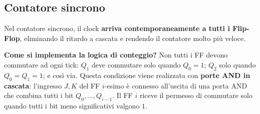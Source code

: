 \subsection{Contatore sincrono}

Nel contatore sincrono, il clock \textbf{arriva contemporaneamente a tutti i Flip-Flop}, eliminando il ritardo a cascata e rendendo il contatore molto più veloce.

\medskip
\noindent\textbf{Come si implementa la logica di conteggio?} Non tutti i FF devono commutare ad ogni tick: $Q_1$ deve commutare solo quando $Q_0=1$; $Q_2$ solo quando $Q_0=Q_1=1$; e così via. Questa condizione viene realizzata con \textbf{porte AND in cascata}: l'ingresso $J,K$ del FF $i$-esimo è connesso all'uscita di una porta AND che combina tutti i bit $Q_0, \ldots, Q_{i-1}$. Il FF $i$ riceve il permesso di commutare solo quando tutti i bit meno significativi valgono $1$.

